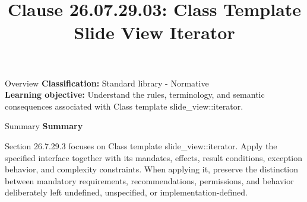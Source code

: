 \documentclass[10pt,letterpaper]{article}
\title{Clause 26.07.29.03: Class Template Slide View Iterator}
\author{}
\date{}
\begin{document}
\maketitle
\begin{CornellOverviewBox}{Overview}
\textbf{Classification:} Standard library - Normative\\[2pt]
\textbf{Learning objective:} Understand the rules, terminology, and semantic consequences associated with Class template slide\_view::iterator.
\end{CornellOverviewBox}\begin{CornellSummaryBox}{Summary}
{\sffamily\bfseries\color{Accent} Summary}\par\vspace{3pt}Section 26.7.29.3 focuses on Class template slide\_view::iterator. Apply the specified interface together with its mandates, effects, result conditions, exception behavior, and complexity constraints. When applying it, preserve the distinction between mandatory requirements, recommendations, permissions, and behavior deliberately left undefined, unspecified, or implementation-defined.
\end{CornellSummaryBox}
\end{document}
